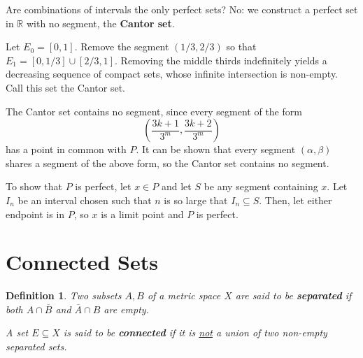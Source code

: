 \documentclass{scrbook}
\newcommand{\R}{\mathbb{R}}
\renewcommand{\underline}{\ul}
\newtheorem{definition}{Definition}
\begin{document}
Are combinations of intervals the only perfect sets? No: we construct a perfect set in $\R$ with no segment, the \textbf{Cantor set}. 

Let $E_0 = [0, 1]$. Remove the segment $(1/3, 2/3)$ so that $E_1 = [0, 1/3] \cup [2/3, 1]$. Removing the middle thirds indefinitely yields a decreasing sequence of compact sets, whose infinite intersection is non-empty. Call this set the Cantor set.

The Cantor set contains no segment, since every segment of the form
\[
	\left(\frac{3k + 1}{3^m}, \frac{3k + 2}{3^m}\right)
\]
has a point in common with $P$. It can be shown that every segment $(\alpha, \beta)$ shares a segment of the above form, so the Cantor set contains no segment.

To show that $P$ is perfect, let $x \in P$ and let $S$ be any segment containing $x$. Let $I_n$ be an interval chosen such that $n$ is so large that $I_n \subseteq S$. Then, let either endpoint is in $P$, so $x$ is a limit point and $P$ is perfect.

\section{Connected Sets}

\begin{definition}
Two subsets $A, B$ of a metric space $X$ are said to be \textbf{separated} if both $A \cap \overline{B}$ and $\overline{A} \cap B$ are empty. 

A set $E \subseteq X$ is said to be \textbf{connected} if it is \underline{not} a union of two non-empty separated sets.
\end{definition}
\end{document}
